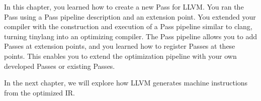 In this chapter, you learned how to create a new Pass for LLVM. You ran the Pass using a Pass pipeline description and an extension point. You extended your compiler with the construction and execution of a Pass pipeline similar to clang, turning tinylang into an optimizing compiler. The Pass pipeline allows you to add Passes at extension points, and you learned how to register Passes at these points. This enables you to extend the optimization pipeline with your own developed Passes or existing Passes.\par

In the next chapter, we will explore how LLVM generates machine instructions from the optimized IR.\par

\newpage